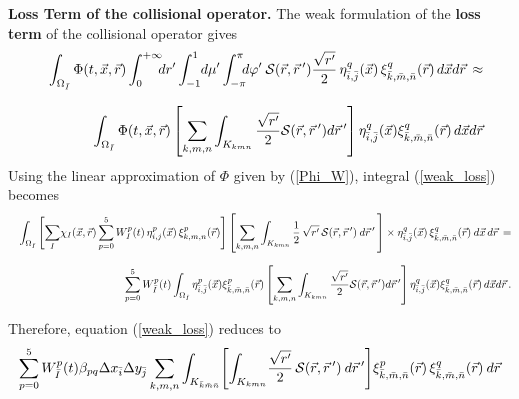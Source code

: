 \documentclass[11pt]{article}
\newcommand{\ib}{\bar{i}} %
\newcommand{\jb}{\bar{j}} %
\newcommand{\kb}{\bar{k}} %
\newcommand{\mb}{\bar{m}} %
\newcommand{\nb}{\bar{n}} %
\begin{document}
\smallskip


{\bf Loss Term of the collisional operator.} The weak formulation of the {\bf loss term} of the collisional operator gives
%
{\small
\begin{eqnarray}
&&
\int_{\Omega_{{\bar{I}}}} %
\Phi(t,\vec{x},\vec{r}) 
\int_{0}^{+ \infty} \hspace{-5pt} dr' \int_{-1}^{1} \hspace{-2pt} d \mu'
\int_{-\pi}^{\pi} \hspace{-5pt} d\varphi' \:
{\cal S}(\vec{r},  \vec{r}\,') \frac{\sqrt{r'}}{2} \,
\eta^{q}_{\ib,\jb}(\vec{x}) \, \xi^{q}_{\kb,\mb,\nb}(\vec{r}) \,
d\vec{x} d\vec{r}  \, \approx
\label{weak_loss}
\\[8pt]
&&
\int_{\Omega_{{\bar{I}}}} 
\Phi(t,\vec{x},\vec{r}) 
\left[ 
\sum_{k,m,n} \int_{K_{k m n}} \frac{\sqrt{r'}}{2}
{\cal S}(\vec{r},  \vec{r}\,')  d\vec{r}\,' 
\right]
\eta^{q}_{\ib,\jb}(\vec{x})  \xi^{q}_{\kb,\mb,\nb}(\vec{r}) \,
d\vec{x} d\vec{r} 
\nonumber
\end{eqnarray}
}
%
Using the linear approximation of $\Phi$ given by (\ref{Phi_W}), integral (\ref{weak_loss}) becomes
%
{\small
\begin{eqnarray*}
&&
\int_{\Omega_{{\bar{I}}}} 
\left[ 
\sum_{I} \! \chi_{I}(\vec{x},\vec{r})
\sum_{p=0}^{5} W_{I}^p (t) \, \eta^{p}_{i,j}(\vec{x}) \, \xi^{p}_{k,m,n}(\vec{r})
\right] 
\left[ \sum_{k,m,n} \int_{K_{k m n}} \frac{1}{2} \, \sqrt{r'} \,
{\cal S}(\vec{r},  \vec{r}\,') \: d\vec{r} \, ' \, \right]
\times
\eta^{q}_{\ib,\jb}(\vec{x}) \, \xi^{q}_{\kb,\mb,\nb}(\vec{r}) \:
d\vec{x} \, d\vec{r}  
\, =
\\[8pt]
&&
\sum_{p=0}^{5} W_{{\bar{I}}}^p(t)
\int_{\Omega_{{\bar{I}}}} 
\eta^{p}_{\ib,\jb}(\vec{x})  \xi^{p}_{\kb,\mb,\nb}(\vec{r})
\left[ 
\sum_{k,m,n} \int_{K_{k m n}} \frac{\sqrt{r'}}{2}
{\cal S}(\vec{r},  \vec{r}\,')  d\vec{r}\,' \right]
\eta^{q}_{\ib,\jb}(\vec{x})  \xi^{q}_{\kb,\mb,\nb}(\vec{r}) \,
d\vec{x} d\vec{r} \, .
\end{eqnarray*}
}

Therefore, equation (\ref{weak_loss}) reduces to
{\small
\begin{equation} \label{wxy_loss}
\sum_{p=0}^{5} W_{{\bar{I}}}^p(t)
 \beta_{p q}  \Delta x_{\ib}  \Delta y_{\jb}
\sum_{k,m,n} 
\int_{K_{\kb \mb \nb}} \!
\left[ 
\int_{K_{k m n}} \! 
\frac{\sqrt{r'}}{2} \,
{\cal S}(\vec{r},  \vec{r}\,') \: 
d\vec{r}\,'\right] \!
\xi^{p}_{\kb,\mb,\nb}(\vec{r}) \,
\xi^{q}_{\kb,\mb,\nb}(\vec{r}) \:
d\vec{r}  
\end{equation}
}
\end{document}
